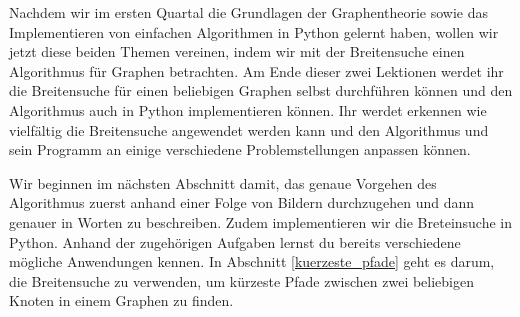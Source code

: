 Nachdem wir im ersten Quartal die Grundlagen der Graphentheorie sowie das Implementieren von einfachen Algorithmen in Python gelernt haben, wollen wir jetzt diese beiden Themen vereinen, indem wir mit der Breitensuche einen Algorithmus für Graphen betrachten. Am Ende dieser zwei Lektionen werdet ihr die Breitensuche für einen beliebigen Graphen selbst durchführen können und den Algorithmus auch in Python implementieren können. Ihr werdet erkennen wie vielfältig die Breitensuche angewendet werden kann und den Algorithmus und sein Programm an einige verschiedene Problemstellungen anpassen können.

Wir beginnen im nächsten Abschnitt damit, das genaue Vorgehen des Algorithmus zuerst anhand einer Folge von Bildern durchzugehen und dann genauer in Worten zu beschreiben. Zudem implementieren wir die Breteinsuche in Python. Anhand der zugehörigen Aufgaben lernst du bereits verschiedene mögliche Anwendungen kennen.  In Abschnitt \ref{kuerzeste_pfade} geht es darum, die Breitensuche zu verwenden, um kürzeste Pfade zwischen zwei beliebigen Knoten in einem Graphen zu finden.
